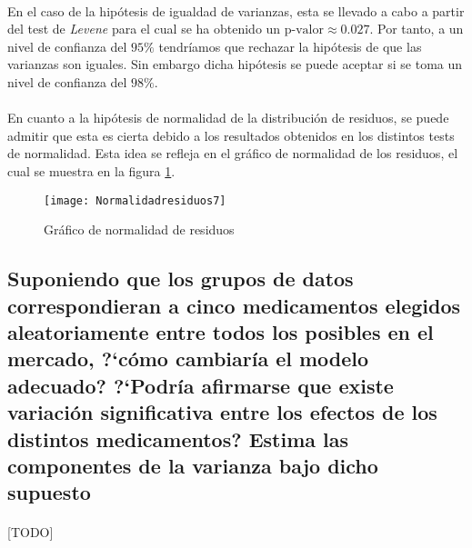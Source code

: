 \documentclass{article}
\begin{document}
      \paragraph{}
      En el caso de la hipótesis de igualdad de varianzas, esta se llevado a cabo a partir del test de \emph{Levene} para el cual se ha obtenido un $\text{p-valor} \approx 0.027$. Por tanto, a un nivel de confianza del $95\%$ tendríamos que rechazar la hipótesis de que las varianzas son iguales. Sin embargo dicha hipótesis se puede aceptar si se toma un nivel de confianza del $98\%$.

      \paragraph{}
      En cuanto a la hipótesis de normalidad de la distribución de residuos, se puede admitir que esta es cierta debido a los resultados obtenidos en los distintos tests de normalidad. Esta idea se refleja en el gráfico de normalidad de los residuos, el cual se muestra en la figura \ref{fig:figura_2}.

      \begin{figure}[H]
        \centering
        \texttt{[image: Normalidadresiduos7]}
        \caption{Gráfico de normalidad de residuos}
        \label{fig:figura_2}
      \end{figure}



    \subsection{Suponiendo que los grupos de datos correspondieran a cinco medicamentos elegidos aleatoriamente entre todos los posibles en el mercado, ?`cómo cambiaría el modelo adecuado? ?`Podría afirmarse que existe variación significativa entre los efectos de los distintos medicamentos? Estima las componentes de la varianza bajo dicho supuesto}

      \paragraph{}
      [TODO]
\end{document}
